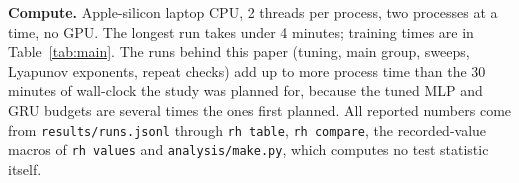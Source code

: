 \textbf{Compute.} Apple-silicon laptop CPU, 2 threads per process, two processes at a time, no GPU. The longest run takes under 4 minutes; training times are in Table~\ref{tab:main}. The runs behind this paper (tuning, main group, sweeps, Lyapunov exponents, repeat checks) add up to more process time than the 30 minutes of wall-clock the study was planned for, because the tuned MLP and GRU budgets are several times the ones first planned. All reported numbers come from \texttt{results/runs.jsonl} through \texttt{rh table}, \texttt{rh compare}, the recorded-value macros of \texttt{rh values} and \texttt{analysis/make.py}, which computes no test statistic itself.
